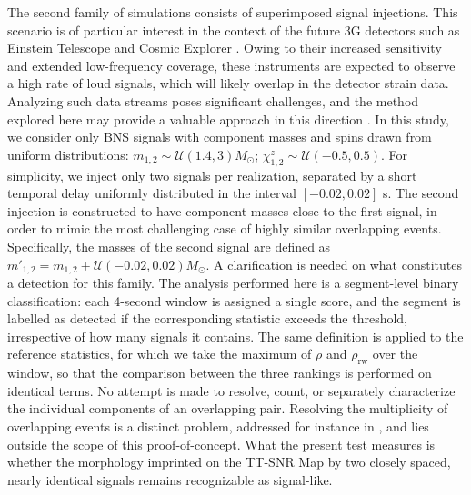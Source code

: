 \documentclass[aps,prd,twocolumn,superscriptaddress,nofootinbib, longbibliography]{revtex4-2}
\begin{document}
	The second family of simulations consists of superimposed signal injections. This scenario is of particular interest in the context of the future 3G detectors such as Einstein Telescope \cite{et_bluebook} and Cosmic Explorer \cite{cosmic_explorer_horizon}. Owing to their increased sensitivity and extended low-frequency coverage, these instruments are expected to observe a high rate of loud signals, which will likely overlap in the detector strain data. Analyzing such data streams poses significant challenges, and the method explored here may provide a valuable approach in this direction \cite{PhysRevD.106.104045}.
	In this study, we consider only BNS signals with component masses and spins drawn from uniform distributions: $m_{1,2} \sim \mathcal{U}(1.4, 3)M_\odot$; $\chi^z_{1,2} \sim \mathcal{U}(-0.5, 0.5)$.
	For simplicity, we inject only two signals per realization, separated by a short temporal delay uniformly distributed in the interval $[-0.02, 0.02]$ s. The second injection is constructed to have component masses close to the first signal, in order to mimic the most challenging case of highly similar overlapping events. Specifically,  the masses of the second signal are defined as $m'_{1,2} = m_{1,2} + \mathcal{U}(-0.02, 0.02)M_\odot$. A clarification is needed on what constitutes a detection for this family. The analysis performed here is a segment-level binary classification: each 4-second window is assigned a single score, and the segment is labelled as detected if the corresponding statistic exceeds the threshold, irrespective of how many signals it contains. The same definition is applied to the reference statistics, for which we take the maximum of $\rho$ and $\rho_\mathrm{rw}$ over the window, so that the comparison between the three rankings is performed on identical terms. No attempt is made to resolve, count, or separately characterize the individual components of an overlapping pair. Resolving the multiplicity of overlapping events is a distinct problem, addressed for instance in \cite{PhysRevD.106.104045}, and lies outside the scope of this proof-of-concept. What the present test measures is whether the morphology imprinted on the TT-SNR Map by two closely spaced, nearly identical signals remains recognizable as signal-like.
\end{document}
